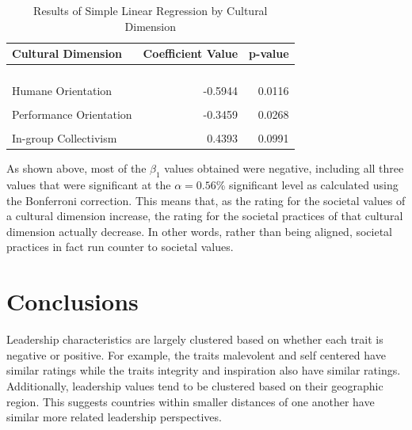 \documentclass[
]{article}
\begin{document}
\begin{table}[!h]

\caption{\label{tab:SPV SLR Table}Results of Simple Linear Regression by Cultural Dimension}
\centering
\begin{tabular}[t]{lrr}
\toprule
Cultural Dimension & Coefficient Value & p-value\\
\midrule
\cellcolor[HTML]{E5F5E0}{Uncertainty Avoidance} & \cellcolor[HTML]{E5F5E0}{-0.6199} & \cellcolor[HTML]{E5F5E0}{0.0000}\\
\cellcolor[HTML]{E5F5E0}{Institutional Collectivism} & \cellcolor[HTML]{E5F5E0}{-0.5251} & \cellcolor[HTML]{E5F5E0}{0.0000}\\
\cellcolor[HTML]{E5F5E0}{Power Distance} & \cellcolor[HTML]{E5F5E0}{-0.4991} & \cellcolor[HTML]{E5F5E0}{0.0006}\\
\cellcolor[HTML]{E5F5E0}{Future Orientation} & \cellcolor[HTML]{E5F5E0}{-0.4725} & \cellcolor[HTML]{E5F5E0}{0.0009}\\
Humane Orientation & -0.5944 & 0.0116\\
\addlinespace
\cellcolor[HTML]{F0F0F0}{Gender Egalitarianism} & \cellcolor[HTML]{F0F0F0}{0.2437} & \cellcolor[HTML]{F0F0F0}{0.0124}\\
Performance Orientation & -0.3459 & 0.0268\\
\cellcolor[HTML]{F0F0F0}{Assertiveness} & \cellcolor[HTML]{F0F0F0}{-0.1507} & \cellcolor[HTML]{F0F0F0}{0.0414}\\
In-group Collectivism & 0.4393 & 0.0991\\
\bottomrule
\end{tabular}
\end{table}

As shown above, most of the \(\beta_1\) values obtained were negative,
including all three values that were significant at the
\(\alpha = 0.56\)\% significant level as calculated using the Bonferroni
correction. This means that, as the rating for the societal values of a
cultural dimension increase, the rating for the societal practices of
that cultural dimension actually decrease. In other words, rather than
being aligned, societal practices in fact run counter to societal
values.

\hypertarget{conclusions}{%
\section{Conclusions}\label{conclusions}}

Leadership characteristics are largely clustered based on whether each
trait is negative or positive. For example, the traits malevolent and
self centered have similar ratings while the traits integrity and
inspiration also have similar ratings. Additionally, leadership values
tend to be clustered based on their geographic region. This suggests
countries within smaller distances of one another have similar more
related leadership perspectives.
\end{document}
